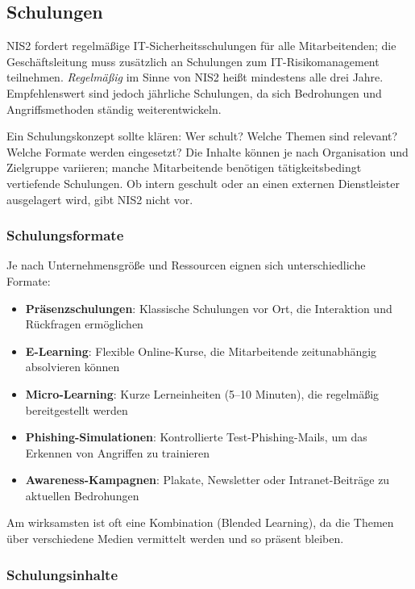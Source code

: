 \newpage
\subsection{Schulungen}

NIS2 fordert regelmäßige IT-Sicherheitsschulungen für alle Mitarbeitenden; die Geschäftsleitung muss zusätzlich an Schulungen zum IT-Risikomanagement teilnehmen. \textit{Regelmäßig} im Sinne von NIS2 heißt mindestens alle drei Jahre. Empfehlenswert sind jedoch jährliche Schulungen, da sich Bedrohungen und Angriffsmethoden ständig weiterentwickeln.

Ein Schulungskonzept sollte klären: Wer schult? Welche Themen sind relevant? Welche Formate werden eingesetzt? Die Inhalte können je nach Organisation und Zielgruppe variieren; manche Mitarbeitende benötigen tätigkeitsbedingt vertiefende Schulungen. Ob intern geschult oder an einen externen Dienstleister ausgelagert wird, gibt NIS2 nicht vor.

\subsubsection{Schulungsformate}

Je nach Unternehmensgröße und Ressourcen eignen sich unterschiedliche Formate:

\begin{itemize}
    \item \textbf{Präsenzschulungen}: Klassische Schulungen vor Ort, die Interaktion und Rückfragen ermöglichen
    \item \textbf{E-Learning}: Flexible Online-Kurse, die Mitarbeitende zeitunabhängig absolvieren können
    \item \textbf{Micro-Learning}: Kurze Lerneinheiten (5–10 Minuten), die regelmäßig bereitgestellt werden
    \item \textbf{Phishing-Simulationen}: Kontrollierte Test-Phishing-Mails, um das Erkennen von Angriffen zu trainieren
    \item \textbf{Awareness-Kampagnen}: Plakate, Newsletter oder Intranet-Beiträge zu aktuellen Bedrohungen
\end{itemize}

Am wirksamsten ist oft eine Kombination (Blended Learning), da die Themen über verschiedene Medien vermittelt werden und so präsent bleiben.
\newpage
\subsubsection{Schulungsinhalte}

